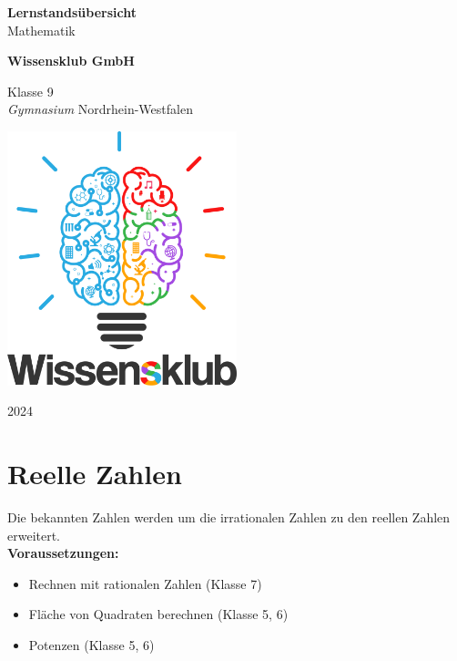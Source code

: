 \documentclass{article}
\begin{document}
\begin{titlepage}
    \begin{center}
        \vspace*{1cm}
            
        \Huge
        \textbf{Lernstandsübersicht}\\            
        \vspace{0.5cm}
        \LARGE
        Mathematik
            
        \vspace{1.5cm}
            
        \textbf{Wissensklub GmbH}
            
        \vfill
            
        Klasse 9\\
        \textit{Gymnasium} Nordrhein-Westfalen
            
        \vspace{0.8cm}
            
        \includegraphics[width=0.5\textwidth]{Wissensklub-Logo.png}
            
        \Large
        2024          
    \end{center}
\end{titlepage}

\section{Reelle Zahlen}
Die bekannten Zahlen werden um die irrationalen Zahlen zu den reellen Zahlen erweitert.\\
\textbf{Voraussetzungen:}
\begin{itemize}
    \item Rechnen mit rationalen Zahlen (Klasse 7)
    \item Fläche von Quadraten berechnen (Klasse 5, 6)
    \item Potenzen (Klasse 5, 6)
\end{itemize}
\end{document}
